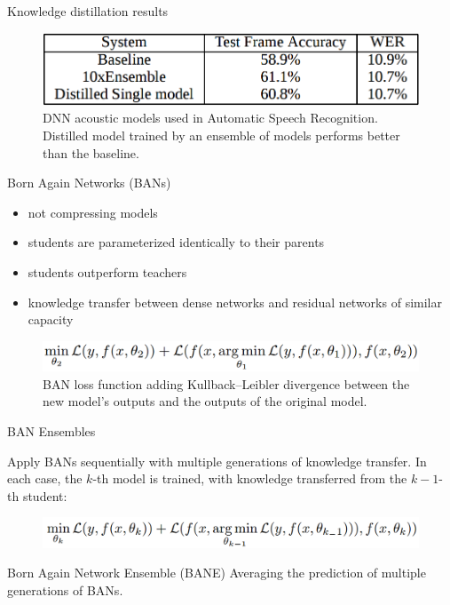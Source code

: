 \documentclass{beamer}
\begin{document}
\begin{frame}{Knowledge distillation results}

\begin{figure}[h]
\includegraphics[width=\textwidth]{img/distilled_result}
\caption{DNN acoustic models used in Automatic Speech Recognition. Distilled model trained by an ensemble of models performs better than the baseline. \cite{cit:distill}}
\end{figure}

\end{frame}
\begin{frame}{Born Again Networks (BANs)}

\begin{itemize}
\item not compressing models
\item students are parameterized identically to their parents
\item students outperform teachers
\item knowledge transfer between dense networks and residual
networks of similar capacity
\end{itemize}

\vfill

\begin{figure}[h]
\includegraphics[width=\textwidth]{img/BAN_loss_func}
\caption{BAN loss function adding Kullback–Leibler divergence between the new model’s outputs and the outputs of the original model. \cite{cit:ban}}
\end{figure}

\end{frame}
\begin{frame}{BAN Ensembles}

Apply BANs sequentially with multiple generations of knowledge transfer. In
each case, the $k$-th model is trained, with knowledge transferred from the $k-1$-th student:

\begin{figure}[h]
\includegraphics[width=\textwidth]{img/sequential_ban1}
\end{figure}

\begin{block}{Born Again Network Ensemble (BANE)}
Averaging the prediction of multiple generations of BANs.
\end{block}
 

\end{frame}
\end{document}
